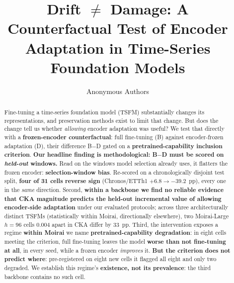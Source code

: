 \documentclass{article}
\title{Drift $\neq$ Damage: A Counterfactual Test of Encoder Adaptation in Time-Series Foundation Models}
\author{
  Anonymous Authors
}
\begin{document}
\maketitle

\begin{abstract}
Fine-tuning a time-series foundation model (TSFM) substantially changes its representations, and preservation methods exist to limit that change. But does the change tell us whether \emph{allowing} encoder adaptation was useful? We test that directly with a \textbf{frozen-encoder counterfactual}: full fine-tuning (B) against encoder-frozen adaptation (D), their difference B$-$D gated on a \textbf{pretrained-capability inclusion criterion}. \textbf{Our headline finding is methodological: B$-$D must be scored on \emph{held-out} windows.} Read on the windows model selection already uses, it flatters the frozen encoder: \textbf{selection-window bias}. Re-scored on a chronologically disjoint test split, \textbf{four of 31 cells reverse sign} (Chronos/ETTh1 $+6.8 \to -39.2$~pp), every one in the \emph{same} direction. Second, \textbf{within a backbone we find no reliable evidence that CKA magnitude predicts the held-out incremental value of allowing encoder-side adaptation} under our evaluated protocols; across three architecturally distinct TSFMs (statistically within Moirai, directionally elsewhere), two Moirai-Large $h{=}96$ cells $0.004$ apart in CKA differ by $33$~pp. Third, the intervention exposes a regime \textbf{within Moirai} we name \textbf{pretrained-capability degradation}: in eight cells meeting the criterion, full fine-tuning leaves the model \textbf{worse than not fine-tuning at all}, in every seed, while a frozen encoder \emph{improves} it. \textbf{But the criterion does not predict where}: pre-registered on eight new cells it flagged all eight and only two degraded. We establish this regime's \textbf{existence, not its prevalence}: the third backbone contains no such cell.
\end{abstract}
\end{document}
